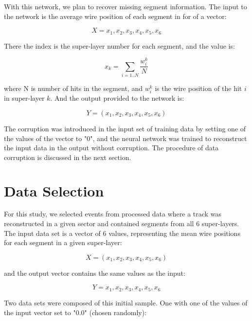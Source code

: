 \documentclass[12pt]{article}
\begin{document}
With this network, we plan to recover missing segment information. The input to the network is
the average wire position of each segment in for of a vector:

\begin{equation}
X = {x_1,x_2,x_3,x_4,x_5,x_6}
\end{equation}

There the index is the super-layer number for each segment, and the value is:

\begin{equation}
x_k = \sum_{i=1..N} \frac{w^k_i}{N}
\end{equation}

where N is number of hits in the segment, and $w^k_i$ is the wire position of the hit $i$
in super-layer $k$. And the output provided to the network is:

\begin{equation}
Y = (x_1,x_2,x_3,x_4,x_5,x_6)
\end{equation}

The corruption was introduced in the input set of training data by setting one of the values of the vector to "0",
and the neural network was trained to reconstruct the input data in the output without corruption. The procedure
of data corruption is discussed in the next section.


\section{Data Selection}
\label{section:data}

\indent

For this study, we selected events from processed data where a track was reconstructed in a given
sector and contained segments from all 6 super-layers. The input data set is a vector of 6 values,
representing the mean wire positions for each segment in a given super-layer:

\begin{equation}
 X = (x_1,x_2,x_3,x_4,x_5,x_6)
\end{equation}

and the output vector contains the same values as the input:

\begin{equation}
Y ={x_1,x_2,x_3,x_4,x_5,x_6}
\end{equation}

Two data sets were composed of this initial sample. One with one of the values of the input vector set to "0.0"
(chosen randomly):
\end{document}
